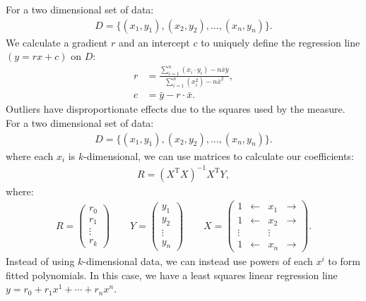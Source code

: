 For a two dimensional set of data: \begin{gather*}
    D = \{(x_1, y_1), (x_2, y_2), \ldots, (x_n, y_n)\}.
\end{gather*} We calculate a gradient $r$ and an intercept $c$ to 
uniquely define the regression line $(y = rx + c)$ on $D$: \begin{align*}
    r &= \frac{
        \sum_{i = 1}^n (x_i \cdot y_i) - n\bar{x}\bar{y}
    }{
        \sum_{i = 1}^n (x_i^2) - n\bar{x}^2
    }, \\
    c &= \bar{y} - r \cdot \bar{x}.
\end{align*} Outliers have disproportionate effects due to the
squares used by the measure. 
\\[\baselineskip]
For a two dimensional set of data: 
\begin{gather*}
    D = \{(x_1, y_1), (x_2, y_2), \ldots, (x_n, y_n)\}.
\end{gather*} where each $x_i$ is $k$-dimensional,
we can use matrices to calculate our coefficients: \begin{gather*}
    R = (X^{\text{T}}X)^{-1}X^{\text{T}}Y,
\end{gather*} where: \begin{gather*}
    R = \begin{pmatrix}
        r_0 \\ r_1 \\ \vdots \\ r_k
    \end{pmatrix} 
    \qquad
    Y = \begin{pmatrix}
        y_1 \\ y_2 \\ \vdots \\ y_n
    \end{pmatrix}
    \qquad
    X = \begin{pmatrix}
        1      & \leftarrow & x_1    & \rightarrow \\
        1      & \leftarrow & x_2    & \rightarrow \\
        \vdots &            & \vdots &             \\
        1      & \leftarrow & x_n    & \rightarrow
    \end{pmatrix}.
\end{gather*} 
Instead of using $k$-dimensional data, we can instead use
powers of each $x^i$ to form fitted polynomials.
In this case, we have a least squares linear regression line
$y = r_0 + r_1x^1 + \cdots + r_nx^n$.

